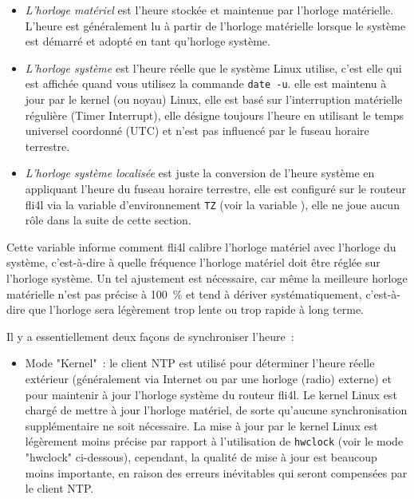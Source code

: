 \begin{description}
{  \begin{itemize}
  \item \emph{L'horloge matériel} est l'heure stockée et maintenue par l'horloge
  matérielle. L'heure est généralement lu à partir de l'horloge matérielle lorsque
  le système est démarré et adopté en tant qu'horloge système.

  \item \emph{L'horloge système} est l'heure réelle que le système Linux utilise,
  c'est elle qui est affichée quand vous utilisez la commande \texttt{date -u}.
  elle est maintenu à jour par le kernel (ou noyau) Linux, elle est basé sur l'interruption
  matérielle régulière (Timer Interrupt), elle désigne toujours l'heure en utilisant
  le temps universel coordonné (UTC) et n'est pas influencé par le fuseau horaire terrestre.

  \item \emph{L'horloge système localisée} est juste la conversion de l'heure système
  en appliquant l'heure du fuseau horaire terrestre, elle est configuré sur le routeur
  fli4l via la variable d'environnement \texttt{TZ} (voir la variable ),
  elle ne joue aucun rôle dans la suite de cette section.
  \end{itemize}

  Cette variable informe comment fli4l calibre l'horloge matériel avec l'horloge du système,
  c'est-à-dire à quelle fréquence l'horloge matériel doit être réglée sur l'horloge système.
  Un tel ajustement est nécessaire, car même la meilleure horloge matérielle n'est pas
  précise à 100~\% et tend à dériver systématiquement, c'est-à-dire que l'horloge sera
  légèrement trop lente ou trop rapide à long terme.

  Il y a essentiellement deux façons de synchroniser l'heure~:

  \begin{itemize}
  \item Mode "Kernel"~: le client NTP est utilisé pour déterminer l'heure réelle extérieur
  (généralement via Internet ou par une horloge (radio) externe) et pour maintenir à
  jour l'horloge système du routeur fli4l. Le kernel Linux est chargé de mettre à jour l'horloge
  matériel, de sorte qu'aucune synchronisation supplémentaire ne soit nécessaire. La mise à
  jour par le kernel Linux est légèrement moins précise par rapport à l'utilisation de \texttt{hwclock}
  (voir le mode "hwclock" ci-dessous), cependant, la qualité de mise à jour est beaucoup moins
  importante, en raison des erreurs inévitables qui seront compensées par le client NTP.


\end{itemize}}
\end{description}
